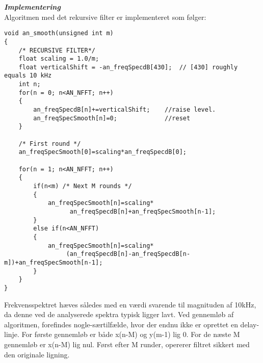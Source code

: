 \textbf{\textit{Implementering}} \\
Algoritmen med det rekursive filter er implementeret som følger:
\begin{verbatim}void an_smooth(unsigned int m)
{
    /* RECURSIVE FILTER*/
    float scaling = 1.0/m;
    float verticalShift = -an_freqSpecdB[430];	// [430] roughly equals 10 kHz
    int n;
    for(n = 0; n<AN_NFFT; n++)
    {
        an_freqSpecdB[n]+=verticalShift;    //raise level.
        an_freqSpecSmooth[n]=0;             //reset
    }

    /* First round */
    an_freqSpecSmooth[0]=scaling*an_freqSpecdB[0];

    for(n = 1; n<AN_NFFT; n++)
    {
        if(n<m)	/* Next M rounds */
        {
            an_freqSpecSmooth[n]=scaling*
                  an_freqSpecdB[n]+an_freqSpecSmooth[n-1];
        }
        else if(n<AN_NFFT)
        {
            an_freqSpecSmooth[n]=scaling*
                 (an_freqSpecdB[n]-an_freqSpecdB[n-m])+an_freqSpecSmooth[n-1];
        }
    }
}\end{verbatim}
Frekvensspektret hæves således med en værdi svarende til magnituden af 10kHz, da denne ved de analyserede spektra typisk ligger lavt. Ved gennemløb af algoritmen, forefindes nogle-særtilfælde, hvor der endnu ikke er oprettet en delay-linje. For første gennemløb er både x(n-M) og y(m-1) lig 0. For de næste M gennemløb er x(n-M) lig nul. Først efter M runder, opererer filtret sikkert med den originale ligning.